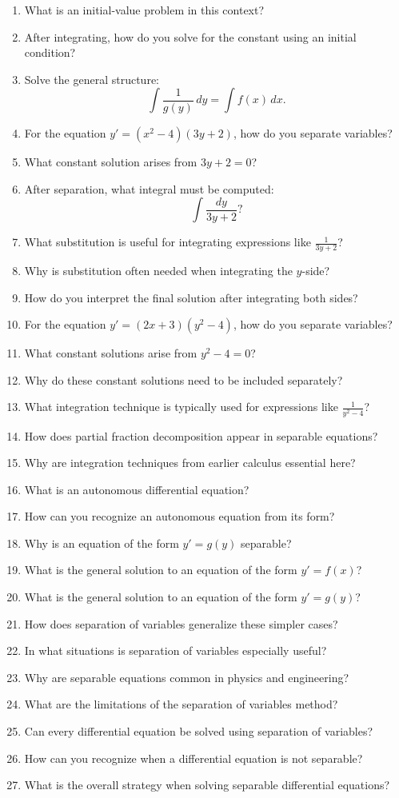 \begin{enumerate}
  \item What is an initial-value problem in this context?
  \item After integrating, how do you solve for the constant using an initial condition?
  \item Solve the general structure:
    \[
      \int \frac{1}{g(y)}\,dy = \int f(x)\,dx.
    \]
  \item For the equation $y' = (x^2 - 4)(3y+2)$, how do you separate variables?
  \item What constant solution arises from $3y+2=0$?
  \item After separation, what integral must be computed:
    \[
      \int \frac{dy}{3y+2}?
    \]
  \item What substitution is useful for integrating expressions like $\frac{1}{3y+2}$?
  \item Why is substitution often needed when integrating the $y$-side?
  \item How do you interpret the final solution after integrating both sides?
  \item For the equation $y' = (2x+3)(y^2 - 4)$, how do you separate variables?
  \item What constant solutions arise from $y^2 - 4 = 0$?
  \item Why do these constant solutions need to be included separately?
  \item What integration technique is typically used for expressions like $\frac{1}{y^2 - 4}$?
  \item How does partial fraction decomposition appear in separable equations?
  \item Why are integration techniques from earlier calculus essential here?
  \item What is an autonomous differential equation?
  \item How can you recognize an autonomous equation from its form?
  \item Why is an equation of the form $y' = g(y)$ separable?
  \item What is the general solution to an equation of the form $y' = f(x)$?
  \item What is the general solution to an equation of the form $y' = g(y)$?
  \item How does separation of variables generalize these simpler cases?
  \item In what situations is separation of variables especially useful?
  \item Why are separable equations common in physics and engineering?
  \item What are the limitations of the separation of variables method?
  \item Can every differential equation be solved using separation of variables?
  \item How can you recognize when a differential equation is not separable?
  \item What is the overall strategy when solving separable differential equations?
\end{enumerate}
